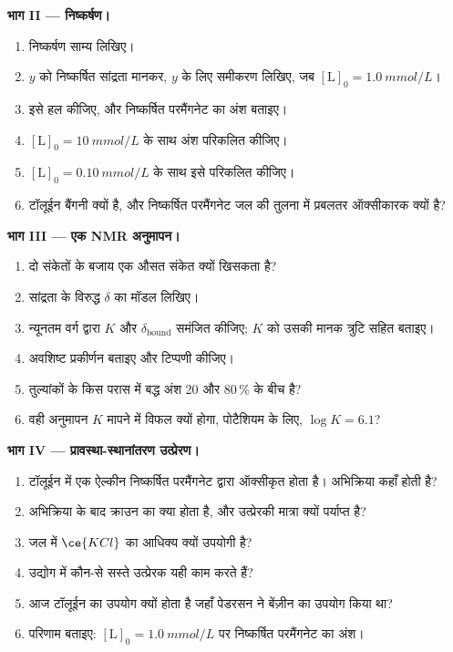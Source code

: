 \begin{problem}
\medskip\noindent\textbf{भाग II --- निष्कर्षण।}
\begin{enumerate}[resume]
  \item निष्कर्षण साम्य लिखिए।
  \item $y$ को निष्कर्षित सांद्रता मानकर, $y$ के लिए समीकरण लिखिए, जब
        $[\mathrm L]_0 = \qty{1.0}{mmol/L}$।
  \item इसे हल कीजिए, और निष्कर्षित परमैंगनेट का अंश बताइए।
  \item $[\mathrm L]_0 = \qty{10}{mmol/L}$ के साथ अंश परिकलित कीजिए।
  \item $[\mathrm L]_0 = \qty{0.10}{mmol/L}$ के साथ इसे परिकलित कीजिए।
  \item टॉलूईन बैंगनी क्यों है, और निष्कर्षित परमैंगनेट जल की तुलना में प्रबलतर
        ऑक्सीकारक क्यों है?
\end{enumerate}

\medskip\noindent\textbf{भाग III --- एक NMR अनुमापन।}
\begin{enumerate}[resume]
  \item दो संकेतों के बजाय एक औसत संकेत क्यों खिसकता है?
  \item {} सांद्रता के विरुद्ध $\delta$ का मॉडल लिखिए।
  \item न्यूनतम वर्ग द्वारा $K$ और $\delta_{\mathrm{bound}}$ समंजित कीजिए; $K$ को उसकी मानक त्रुटि सहित बताइए।
  \item अवशिष्ट प्रकीर्णन बताइए और टिप्पणी कीजिए।
  \item तुल्यांकों के किस परास में बद्ध अंश 20 और 80\,\% के बीच है?
  \item वही अनुमापन $K$ मापने में विफल क्यों होगा, पोटैशियम के लिए, $\log K = 6.1$?
\end{enumerate}

\medskip\noindent\textbf{भाग IV --- प्रावस्था-स्थानांतरण उत्प्रेरण।}
\begin{enumerate}[resume]
  \item टॉलूईन में एक ऐल्कीन निष्कर्षित परमैंगनेट द्वारा ऑक्सीकृत होता है। अभिक्रिया
        कहाँ होती है?
  \item अभिक्रिया के बाद क्राउन का क्या होता है, और उत्प्रेरकी
        मात्रा क्यों पर्याप्त है?
  \item जल में $\ce{KCl}$ का आधिक्य क्यों उपयोगी है?
  \item उद्योग में कौन-से सस्ते उत्प्रेरक यही काम करते हैं?
  \item आज टॉलूईन का उपयोग क्यों होता है जहाँ पेडरसन ने बेंज़ीन का उपयोग किया था?
  \item परिणाम बताइए: $[\mathrm L]_0 = \qty{1.0}{mmol/L}$ पर
        निष्कर्षित परमैंगनेट का अंश।
\end{enumerate}
\end{problem}
